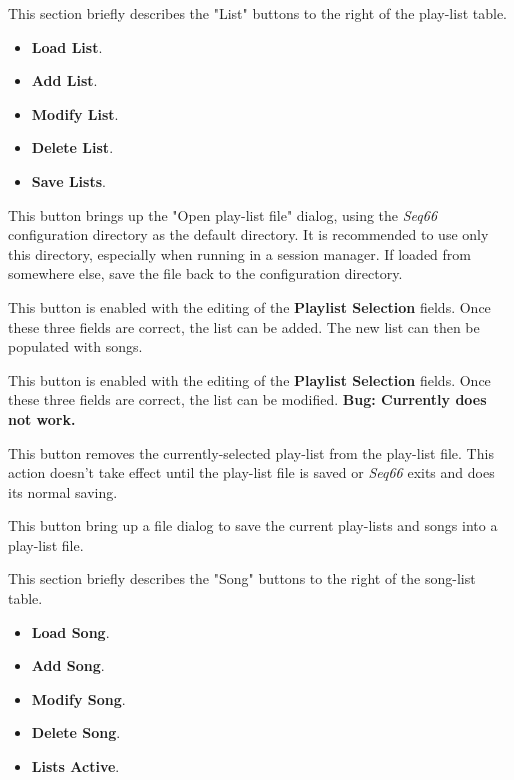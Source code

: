    This section briefly describes the "List" buttons to the right of the
   play-list table.

   \begin{itemize}
      \item \textbf{Load List}.
      \item \textbf{Add List}.
      \item \textbf{Modify List}.
      \item \textbf{Delete List}.
      \item \textbf{Save Lists}.
   \end{itemize}

   \setcounter{ItemCounter}{0}      %

   This button brings up the "Open play-list file" dialog, using the
   \textsl{Seq66} configuration directory as the default directory.
   It is recommended to use only this directory, especially when running in a
   session manager. If loaded from somewhere else, save the file back to the
   configuration directory.

   This button is enabled with the editing of the \textbf{Playlist Selection}
   fields.  Once these three fields are correct, the list can be added.
   The new list can then be populated with songs.

   This button is enabled with the editing of the \textbf{Playlist Selection}
   fields.  Once these three fields are correct, the list can be modified.
   \textbf{Bug: Currently does not work.}

   This button removes the currently-selected play-list from the play-list
   file.  This action doesn't take effect until the play-list file is saved or
   \textsl{Seq66} exits and does its normal saving.

   This button bring up a file dialog to save the current play-lists and songs
   into a play-list file.

   This section briefly describes the "Song" buttons to the right of the
   song-list table.

   \begin{itemize}
      \item \textbf{Load Song}.
      \item \textbf{Add Song}.
      \item \textbf{Modify Song}.
      \item \textbf{Delete Song}.
      \item \textbf{Lists Active}.
   \end{itemize}

